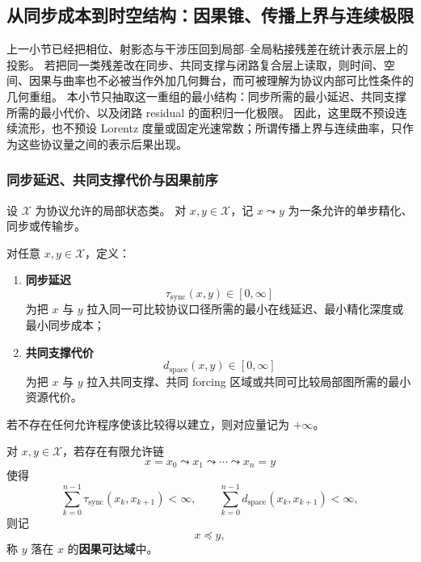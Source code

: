 \subsection{从同步成本到时空结构：因果锥、传播上界与连续极限}\label{subsec:cdim-sync-causal-holonomy-spacetime}
上一小节已经把相位、射影态与干涉压回到局部--全局粘接残差在统计表示层上的投影。
若把同一类残差改在同步、共同支撑与闭路复合层上读取，则时间、空间、因果与曲率也不必被当作外加几何舞台，而可被理解为协议内部可比性条件的几何重组。
本小节只抽取这一重组的最小结构：同步所需的最小延迟、共同支撑所需的最小代价、以及闭路 residual 的面积归一化极限。
因此，这里既不预设连续流形，也不预设 Lorentz 度量或固定光速常数；所谓传播上界与连续曲率，只作为这些协议量之间的表示后果出现。

\subsubsection{同步延迟、共同支撑代价与因果前序}
设 \(\mathcal X\) 为协议允许的局部状态类。
对 \(x,y\in\mathcal X\)，记 \(x\leadsto y\) 为一条允许的单步精化、同步或传输步。

\begin{definition}[同步延迟与共同支撑代价]\label{def:cdim-sync-delay-support-cost}
对任意 \(x,y\in\mathcal X\)，定义：
\begin{enumerate}
  \item \textbf{同步延迟}
  \[
  \tau_{\mathrm{sync}}(x,y)\in[0,\infty]
  \]
  为把 \(x\) 与 \(y\) 拉入同一可比较协议口径所需的最小在线延迟、最小精化深度或最小同步成本；
  \item \textbf{共同支撑代价}
  \[
  d_{\mathrm{space}}(x,y)\in[0,\infty]
  \]
  为把 \(x\) 与 \(y\) 拉入共同支撑、共同 forcing 区域或共同可比较局部图所需的最小资源代价。
\end{enumerate}
若不存在任何允许程序使该比较得以建立，则对应量记为 \(+\infty\)。
\end{definition}

\begin{definition}[因果可达前序]\label{def:cdim-causal-reachability-preorder}
对 \(x,y\in\mathcal X\)，若存在有限允许链
\[
x=x_0\leadsto x_1\leadsto \cdots \leadsto x_n=y
\]
使得
\[
\sum_{k=0}^{n-1}\tau_{\mathrm{sync}}(x_k,x_{k+1})<\infty,
\qquad
\sum_{k=0}^{n-1}d_{\mathrm{space}}(x_k,x_{k+1})<\infty,
\]
则记
\[
x\preceq y,
\]
称 \(y\) 落在 \(x\) 的\textbf{因果可达域}中。
\end{definition}

